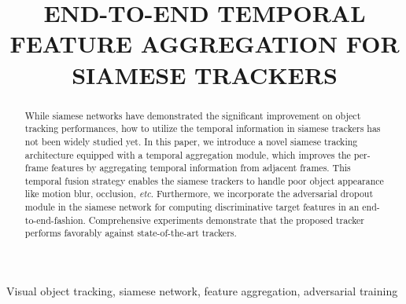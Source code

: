 \documentclass{article}
\title{END-TO-END TEMPORAL FEATURE AGGREGATION FOR SIAMESE TRACKERS}
\begin{document}
%
\maketitle
%
\begin{abstract}
While siamese networks have demonstrated the significant improvement on object tracking performances, how to utilize the temporal information in siamese trackers has not been widely studied yet. In this paper, we introduce a novel siamese tracking architecture equipped with a temporal aggregation module, which improves the per-frame features by aggregating temporal information from adjacent frames. This temporal fusion strategy enables the siamese trackers to handle poor object appearance like motion blur, occlusion, \textit{etc}. Furthermore, we incorporate the adversarial dropout module in the siamese network for computing discriminative target features in an end-to-end-fashion. Comprehensive experiments demonstrate that the proposed tracker performs favorably against state-of-the-art trackers.
\end{abstract}
%
\begin{keywords}
Visual object tracking, siamese network, feature aggregation, adversarial training
\end{keywords}
%
\end{document}
